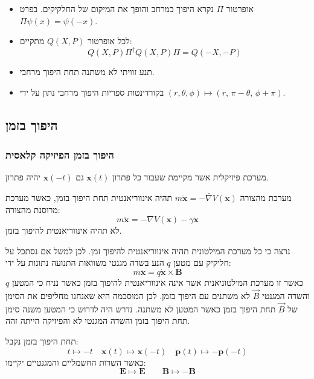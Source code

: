 \documentclass{tstextbook}
\begin{document}
\begin{summary}
  \begin{itemize}
    \item אופרטור \(\Pi\) נקרא היפוך במרחב והופך את המיקום של החלקיקים. בפרט \(\Pi \psi(x)=\psi(-x)\).
    \item לכל אופרטור \(Q(X,P)\) מתקיים:
$$Q(X,P)\Pi^{\dagger}Q(X,P)\Pi=Q(-X,-P)$$
    \item תנע זוויתי לא משתנה תחת היפוך מרחבי.
    \item בקורדינטות ספריות היפוך מרחבי נתון על ידי \(\left( r,\theta,\phi \right)\mapsto\left( r,\,\pi-\theta,\,\phi+\pi \right)\).
  \end{itemize}
\end{summary}
\subsection{היפוך בזמן}

\subsubsection{היפוך בזמן הפיזיקה קלאסית}

\begin{definition}
מערכת פיזיקלית אשר מקיימת שעבור כל פתרון \(\mathbf{x}(t)\) גם \(\mathbf{x}(-t)\) יהיה פתרון.

\end{definition}
\begin{example}
מערכת מהצורה \(m\ddot{\mathbf{x}}=-\bar{\nabla}V(\mathbf{x})\) תהיה אינווריאנטית תחת היפוך בזמן, כאשר מערכת מרוסנת מהצורה:
$$m{\ddot{\mathbf{x}}}=-\nabla V(\mathbf{x})-\gamma{\dot{\mathbf{x}}}$$
לא תהיה אינווריאנטית להיפוך בזמן.

\end{example}
\begin{remark}
נרצה כי כל מערכת המילטונית תהיה אינווריאנטית להיפוך זמן. לכן למשל אם נסתכל על חליקיק עם מטען \(q\) הנע בשדה מגנטי משוואות התנועה נתונות על ידי:
$$m{\ddot{\mathbf{x}}}=q{\dot{\mathbf{x}}}\times\mathbf{B}$$
כאשר זו מערכת המילטוניאנית אשר אינה אינווריאנטית להיפוך בזמן כאשר נניח כי המטען \(q\) והשדה המגנטי \(\vec{B}\) לא משתנים עם היפוך בזמן. לכן המוסכמה היא שאנחנו מחליפים את הסימן של \(\vec{B}\) תחת היפוך בזמן כאשר המטען לא משתנה. נדרש היה לדרוש כי המטען משנה סימן תחת היפוך בזמן והשדה המגנטי לא והפיזיקה הייתה זהה.

\end{remark}
\begin{corollary}
תחת היפוך בזמן נקבל:
$$t\mapsto-t\quad \mathbf{x}(t)\mapsto \mathbf{x}(-t)\quad \mathbf{p}(t)\mapsto-\mathbf{p}(-t)$$
כאשר השדות החשמליים והמגנטיים יקיימו:
$$\mathbf{E}\mapsto\mathbf{E}\qquad \mathbf{B}\mapsto-\mathbf{B}$$

\end{corollary}
\end{document}
